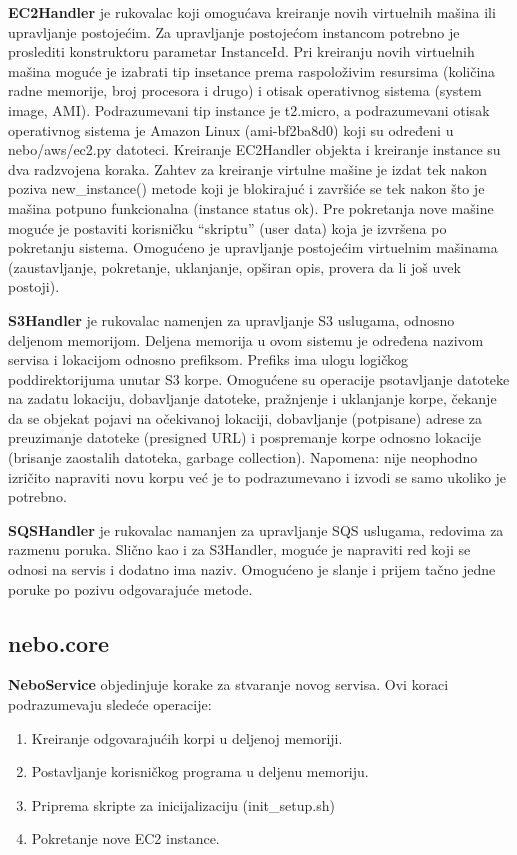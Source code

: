 \documentclass[a4paper]{article}
\begin{document}
{\bf EC2Handler} je rukovalac koji omogućava kreiranje novih virtuelnih mašina
ili upravljanje postojećim. Za upravljanje postojećom instancom potrebno je
proslediti konstruktoru parametar InstanceId. Pri kreiranju novih virtuelnih
mašina moguće je izabrati tip insetance prema raspoloživim resursima (količina
radne memorije, broj procesora i drugo) i otisak operativnog sistema (system
image, AMI). Podrazumevani tip instance je t2.micro, a podrazumevani otisak
operativnog sistema je Amazon Linux (ami-bf2ba8d0) koji su određeni u
nebo/aws/ec2.py datoteci. Kreiranje EC2Handler objekta i kreiranje instance su
dva radzvojena koraka. Zahtev za kreiranje virtulne mašine je izdat tek nakon
poziva new\_instance() metode koji je blokirajuć i završiće se tek nakon što je
mašina potpuno funkcionalna (instance status ok). Pre pokretanja nove mašine
moguće je postaviti korisničku ``skriptu'' (user data) koja je izvršena po
pokretanju sistema. Omogućeno je upravljanje postojećim virtuelnim mašinama
(zaustavljanje, pokretanje, uklanjanje, opširan opis, provera da li još uvek
postoji).

{\bf S3Handler} je rukovalac namenjen za upravljanje S3 uslugama, odnosno
deljenom memorijom. Deljena memorija u ovom sistemu je određena nazivom servisa
i lokacijom odnosno prefiksom. Prefiks ima ulogu logičkog poddirektorijuma
unutar S3 korpe. Omogućene su operacije psotavljanje datoteke na zadatu
lokaciju, dobavljanje datoteke, pražnjenje i uklanjanje korpe, čekanje da se
objekat pojavi na očekivanoj lokaciji, dobavljanje (potpisane) adrese za
preuzimanje datoteke (presigned URL) i pospremanje korpe odnosno lokacije
(brisanje zaostalih datoteka, garbage collection). Napomena: nije neophodno
izričito napraviti novu korpu već je to podrazumevano i izvodi se samo ukoliko
je potrebno.

{\bf SQSHandler} je rukovalac namanjen za upravljanje SQS uslugama, redovima za
razmenu poruka. Slično kao i za S3Handler, moguće je napraviti red koji se
odnosi na servis i dodatno ima naziv. Omogućeno je slanje i prijem tačno jedne
poruke po pozivu odgovarajuće metode.

\subsection{nebo.core}

{\bf NeboService} objedinjuje korake za stvaranje novog servisa. Ovi koraci
podrazumevaju sledeće operacije:

\begin{enumerate}
\item Kreiranje odgovarajućih korpi u deljenoj memoriji.
\item Postavljanje korisničkog programa u deljenu memoriju.
\item Priprema skripte za inicijalizaciju (init\_setup.sh)
\item Pokretanje nove EC2 instance.
\end{enumerate}
\end{document}
